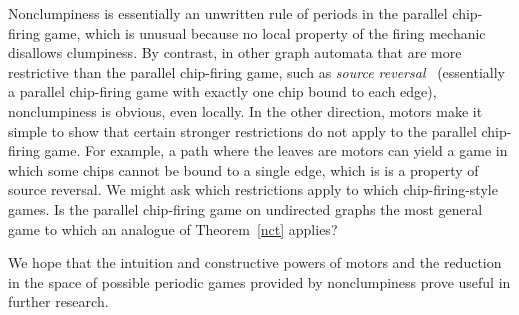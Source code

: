 Nonclumpiness is essentially an unwritten rule of periods in the parallel
chip-firing game, which is unusual because no local property of the firing
mechanic disallows clumpiness. By contrast, in other graph automata
that are more restrictive than the parallel chip-firing game, such as
\emph{source reversal}~\cite{sourceReversal} (essentially a parallel
chip-firing game with exactly one chip bound to each edge),
nonclumpiness is obvious, even locally. In the other direction, motors make
it simple to show that certain stronger restrictions do not apply to the
parallel chip-firing game. For example, a path where the leaves are motors can
yield a game in which some chips cannot be bound to a single edge, which is is
a property of source reversal. We might ask which restrictions apply to which
chip-firing-style games. Is the parallel chip-firing game on undirected graphs
the most general game to which an analogue of Theorem~\ref{nct} applies?

We hope that the intuition and constructive powers of motors and the reduction
in the space of possible periodic games provided by nonclumpiness prove useful
in further research. \FloatBarrier

